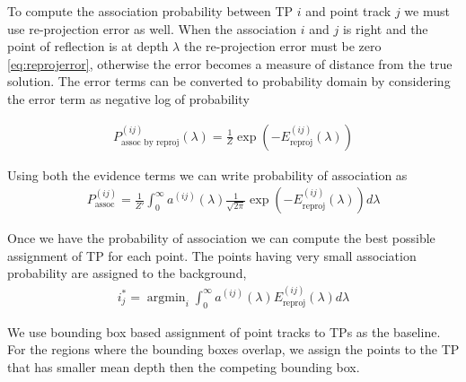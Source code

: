 \documentclass[10pt,twocolumn,letterpaper]{article}
\newcommand{\assocP}{a^{(ij)}(\lambda)}
\newcommand{\Ereproj}{E^{(ij)}_{\text{reproj}}}
\DeclareMathOperator*{\argmin}{\arg\min}
\begin{document}
To compute the association probability between TP $i$ and
point track $j$ we must use re-projection error as well. When the association
$i$ and $j$ is right and the point of reflection is at depth $\lambda$ the
re-projection error must be zero \eqref{eq:reprojerror}, otherwise the error
becomes a measure of distance from the true solution.
The error terms can be converted to probability domain by considering the error
term as negative log of probability

\begin{align}
  P^{(ij)}_{\text{assoc by reproj}}(\lambda) = \frac{1}{Z}\exp(-\Ereproj(\lambda))
\end{align}

Using both the evidence terms we can write probability of association as
\begin{align}
  P^{(ij)}_{\text{assoc}} = \frac{1}{Z'}\int_0^{\infty} \assocP \frac{1}{\sqrt{2\pi}}\exp(-\Ereproj(\lambda))d\lambda
  \label{eq:prob-assoc}
\end{align}

Once we have the probability of association we can compute the best possible
assignment of TP for each point. The points having very small association
probability are assigned to the background,
\begin{align}
  i^*_{j} = \argmin_{i} \int_0^\infty \assocP \Ereproj(\lambda) d\lambda
\end{align}

We use bounding box based assignment of point tracks to TPs as the baseline.
For the regions where the bounding boxes overlap, we assign the points to the
TP that has smaller mean depth then the competing bounding box.

{\small


}
\end{document}
